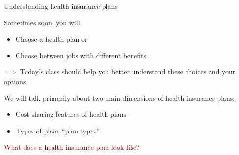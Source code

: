 \begin{frame}{Understanding health insurance plans}

    Sometimes soon, you will
    \begin{itemize}
        \item Choose a health plan or
        \item Choose between jobs with different benefits
    \end{itemize}
    $\implies$ Today's class should help you better understand these choices and your options.
    \vspace{3mm}

    We will talk primarily about two main dimensions of health insurance plans:
    \begin{itemize}
        \item Cost-sharing features of health plans
        \item Types of plans ``plan types''
    \end{itemize}
\end{frame}
\begin{frame}{}

    \begin{center}
        \Large \textcolor{maroon}{What does a health insurance plan look like?}
        \end{center}
\end{frame}
